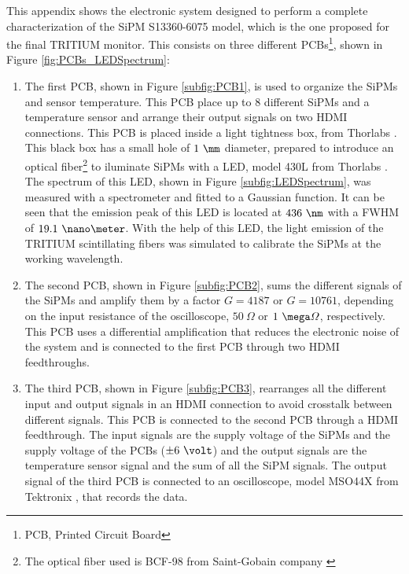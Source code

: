 This appendix shows the electronic system designed to perform a complete characterization of the SiPM S13360-6075 model, which is the one proposed for the final TRITIUM monitor. This consists on three different PCBs\footnote{PCB, Printed Circuit Board}, shown in Figure \ref{fig:PCBs_LEDSpectrum}:

\begin{enumerate}
\item{} The first PCB, shown in Figure \ref{subfig:PCB1}, is used to organize the SiPMs and sensor temperature. This PCB place up to 8 different SiPMs and a temperature sensor and arrange their output signals on two HDMI connections. This PCB is placed inside a light tightness box, from Thorlabs \cite{ThorlabsCompany}. This black box has a small hole of $1~\mm$ diameter, prepared to introduce an optical fiber\footnote{The optical fiber used is BCF-98 from Saint-Gobain company \cite{OpticalFibers}} to iluminate SiPMs with a LED, model 430L from Thorlabs \cite{LEDThorlabs}. The spectrum of this LED, shown in Figure \ref{subfig:LEDSpectrum}, was measured with a spectrometer and fitted to a Gaussian function. It can be seen that the emission peak of this LED is located at $436~\nm$ with a FWHM of $19.1~\nano\meter$. With the help of this LED, the light emission of the TRITIUM scintillating fibers was simulated to calibrate the SiPMs at the working wavelength. 

\item{} The second PCB, shown in Figure \ref{subfig:PCB2}, sums the different signals of the SiPMs and amplify them by a factor $G=4187$ or $G=10761$, depending on the input resistance of the oscilloscope, $50~\varOmega$ or $1~\mega\varOmega$, respectively. This PCB uses a differential amplification that reduces the electronic noise of the system and is connected to the first PCB through two HDMI feedthroughs.

\item{} The third PCB, shown in Figure \ref{subfig:PCB3}, rearranges all the different input and output signals in an HDMI connection to avoid crosstalk between different signals. This PCB is connected to the second PCB through a HDMI feedthrough. The input signals are the supply voltage of the SiPMs and the supply voltage of the PCBs ($\pm 6~\volt$) and the output signals are the temperature sensor signal and the sum of all the SiPM signals. The output signal of the third PCB is connected to an oscilloscope, model MSO44X from Tektronix \cite{Oscilloscope}, that records the data.

\end{enumerate}

